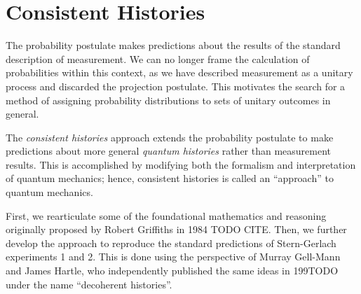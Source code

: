 \usetikzlibrary{shapes.geometric}
\usetikzlibrary{positioning}

\chapter{Consistent Histories}

The probability postulate makes predictions about the results of the standard description of measurement. We can no longer frame the calculation of probabilities within this context, as we have  described measurement as a unitary process and discarded the projection postulate. This motivates the search for a method of assigning probability distributions to sets of unitary outcomes in general.

The \textit{consistent histories} approach extends the probability postulate to make predictions about  more general \textit{quantum histories} rather than measurement results. This is accomplished by modifying both the formalism and interpretation of quantum mechanics; hence, consistent histories is called an ``approach'' to quantum mechanics.

First, we rearticulate some of the foundational mathematics and reasoning originally proposed by Robert Griffiths in 1984 TODO CITE. Then, we further develop the approach to reproduce the standard predictions of Stern-Gerlach experiments 1 and 2. This is done using the perspective of Murray Gell-Mann and James Hartle, who independently published the same ideas in 199TODO under the name ``decoherent histories''.

%
%
%
%


